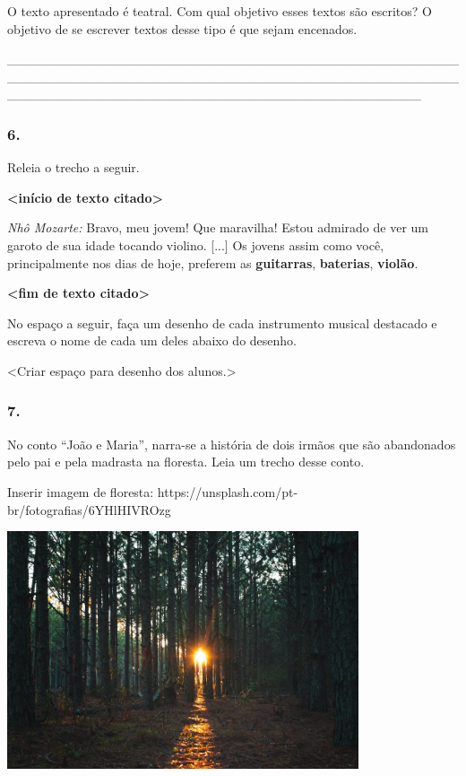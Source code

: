 O texto apresentado é teatral. Com qual objetivo esses textos são
escritos? O objetivo de se escrever textos desse tipo é que sejam
encenados.

\_\_\_\_\_\_\_\_\_\_\_\_\_\_\_\_\_\_\_\_\_\_\_\_\_\_\_\_\_\_\_\_\_\_\_\_\_\_\_\_\_\_\_\_\_\_\_\_\_\_\_\_\_\_\_\_\_\_\_\_\_\_\_\_\_\_\_\_\_\_\_\_\_\_\_\_\_\_\_\_\_\_\_\_\_\_\_\_\_\_\_\_\_\_\_\_\_\_\_\_\_\_\_\_\_\_\_\_\_\_\_\_\_\_\_\_\_\_\_\_\_\_\_\_\_\_\_\_\_\_\_\_\_\_\_\_\_\_\_\_

\subsubsection{6. }\label{section-21}

Releia o trecho a seguir.

\textbf{\textless{}início de texto citado\textgreater{}}

\emph{Nhô Mozarte:} Bravo, meu jovem! Que maravilha! Estou admirado de
ver um garoto de sua idade tocando violino. {[}...{]} Os jovens assim
como você, principalmente nos dias de hoje, preferem as
\textbf{guitarras}, \textbf{baterias}, \textbf{violão}.

\textbf{\textless{}fim de texto citado\textgreater{}}

No espaço a seguir, faça um desenho de cada instrumento musical
destacado e escreva o nome de cada um deles abaixo do desenho.

\textless{}Criar espaço para desenho dos alunos.\textgreater{}

\subsubsection{7. }\label{section-22}

No conto ``João e Maria'', narra-se a história de dois irmãos que são
abandonados pelo pai e pela madrasta na floresta. Leia um trecho desse
conto.

Inserir imagem de floresta:
https://unsplash.com/pt-br/fotografias/6YHlHIVROzg

\includegraphics[width=4.08333in,height=2.76048in]{media/image3.jpeg}

